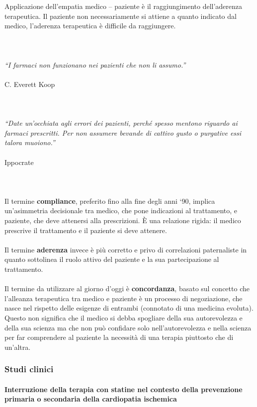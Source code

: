 Applicazione dell'empatia medico -- paziente è il raggiungimento
dell'aderenza terapeutica. Il paziente non necessariamente si attiene a
quanto indicato dal medico, l'aderenza terapeutica è difficile da
raggiungere.
\\\\\\\\
\emph{``I farmaci non funzionano nei pazienti che non li assumo.''}
\\\\
C. Everett Koop
\\\\\\\\
\emph{``Date un'occhiata agli errori dei pazienti, perché spesso mentono
riguardo ai farmaci prescritti. Per non assumere bevande di cattivo
gusto o purgative essi talora muoiono.''}
\\\\
Ippocrate
\\\\\\\\
Il termine \textbf{compliance}, preferito fino alla fine degli anni `90,
implica un'asimmetria decisionale tra medico, che pone indicazioni al
trattamento, e paziente, che deve attenersi alla prescrizioni. È una
relazione rigida: il medico prescrive il trattamento e il paziente si
deve attenere.
\\\\
Il termine \textbf{aderenza} invece è più corretto e privo di
correlazioni paternaliste in quanto sottolinea il ruolo attivo del
paziente e la sua partecipazione al trattamento.
\\\\
Il termine da utilizzare al giorno d'oggi è \textbf{concordanza}, basato
sul concetto che l'alleanza terapeutica tra medico e paziente è un
processo di negoziazione, che nasce nel rispetto delle esigenze di
entrambi (connotato di una medicina evoluta). Questo non significa che
il medico si debba spogliare della sua autorevolezza e della sua scienza
ma che non può confidare solo nell'autorevolezza e nella scienza per far
comprendere al paziente la necessità di una terapia piuttosto che di
un'altra.

\subsubsection{Studi clinici}

\paragraph{Interruzione della terapia con statine nel contesto della prevenzione primaria o secondaria della cardiopatia ischemica}

